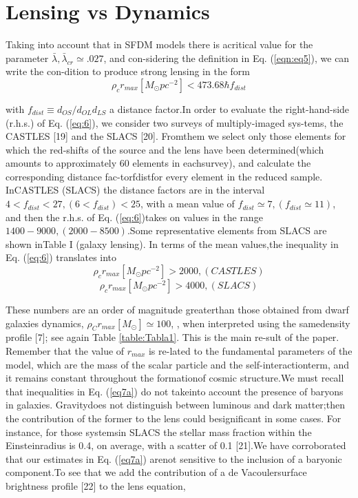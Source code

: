 \documentclass[9.5pt, twocolumn]{article}
\begin{document}
\section {\centering  Lensing vs Dynamics}

Taking into account that in SFDM models there is acritical value for the parameter \(\bar{\lambda} , \bar{\lambda}_{cr} \simeq .027\), and con-sidering the definition in Eq. (\ref{eqn:eq5}), we can write the con-dition to produce strong lensing in the form \\
\begin{equation}\label{eq:6}
	\rho_{c} r_{max}[M_{\odot}pc^{-2}]  < 473.68 \hbar f_{dist}
\end{equation}

with \(f_{dist}\equiv d_{OS}/d_{OL}d_{LS}\) a distance factor.In  order  to  evaluate  the  right-hand-side  (r.h.s.)    of Eq. (\ref{eq:6}), we consider two surveys of multiply-imaged sys-tems,  the  CASTLES  [19]  and  the  SLACS  [20].   Fromthem  we  select  only  those  elements  for  which  the  red-shifts  of  the  source  and  the  lens  have  been  determined(which  amounts  to  approximately  60  elements  in  eachsurvey),  and  calculate  the  corresponding  distance  fac-torfdistfor  every  element  in  the  reduced  sample.   InCASTLES (SLACS) the distance factors are in the interval  \(4<f_{dist}<27, (6<f_{dist})<25\), with a mean value of \(f_{dist}\simeq 7, (f_{dist}\simeq 11)\), and then the r.h.s.  of Eq. (\ref{eq:6})takes on values in the range \(1400-9000, (2000-8500)\).Some representative elements from SLACS are shown inTable  I  (galaxy  lensing).   In  terms  of  the  mean  values,the inequality in Eq. (\ref{eq:6}) translates into
 \begin{equation}\label{eq7a}
 	\rho_{c}r_{max}[M_{\odot}pc^{-2}]>2000, (CASTLES)
 \end{equation}
  \begin{equation}\label{7b}
 	\rho_{c}r_{max}[M_{\odot}pc^{-2}]>4000, (SLACS)
 \end{equation}
 
These  numbers  are  an  order  of  magnitude  greaterthan   those   obtained   from   dwarf   galaxies   dynamics, \(\rho_{C}r_{max}[M_{\odot}]\simeq 100\), , when interpreted using the samedensity profile [7]; see again Table \ref{table:Tabla1}. This is the main re-sult of the paper.  Remember that the value of \(r_{max}\) is re-lated to the fundamental parameters of the model, which are the mass of the scalar particle and the self-interactionterm, and it remains constant throughout the formationof cosmic structure.We must recall that inequalities in Eq.  (\ref{eq7a}) do not takeinto account the presence of baryons in galaxies.  Gravitydoes not distinguish between luminous and dark matter;then the contribution of the former to the lens could besignificant in some cases.  For instance, for those systemsin SLACS the stellar mass fraction within the Einsteinradius is 0.4, on average, with a scatter of 0.1 [21].We have corroborated that our estimates in Eq. (\ref{eq7a}) arenot sensitive to the inclusion of a baryonic component.To  see  that  we  add  the  contribution  of  a  de  Vacoulersurface brightness profile [22] to the lens equation,
\end{document}
